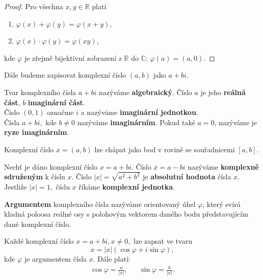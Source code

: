 \begin{proof}
    Pro všechna $x,y \in \mathbb R$ platí
    \begin{enumerate}[$i.$]
    \item $\varphi(x)+\varphi(y) = \varphi(x+y),$
   	\item $\varphi(x)\cdot\varphi(y) = \varphi(xy),$
    \end{enumerate}
    kde $\varphi$ je zřejmě bijektivní zobrazení z $\mathbb R$ do $\mathbb C$: $\varphi(a)=(a,0).$
\end{proof}

\begin{pozn}
    Dále budeme zapisovat komplexní číslo $(a,b)$ jako $a+bi.$
\end{pozn}

\begin{definition}
    Tvar komplexního čísla $a+bi$ nazýváme \textbf{algebraický}. Číslo $a$ je jeho
   \textbf{reálná část}, $b$ \textbf{imaginární část}.\\
  Číslo $(0,1)$ označme $i$ a nazýváme \textbf{imaginární jednotkou}. \\
  Čísla $a+bi,$ kde $b\ne 0$ nazýváme \textbf{imaginárním}. Pokud také $a=0$,
  nazýváme je \textbf{ryze imaginárním}.
\end{definition}

\begin{pozn}
    Komplexní číslo $x=(a,b)$ lze chápat jako bod v rovině se souřadnicemi $[a,b].$
\end{pozn}

\begin{definition}
    Nechť je dáno komplexní číslo $x= a+bi.$ Číslo $\overline{x}=a-bi$ nazýváme
   \textbf{komplexně sdruženým} k číslu $x$. Číslo $|x|=\sqrt{a^2+b^2}$ je
   \textbf{absolutní hodnota} čísla $x$. Jestliže $|x|=1,$ číslu $x$ říkáme \textbf{komplexní jednotka}.
\end{definition}

\begin{definition}
\textbf{Argumentem} komplexního čísla nazýváme orientovaný úhel $\varphi$, který svírá kladná
poloosa reálné osy s polohovým vektorem daného bodu představujícím dané komplexní číslo.
\end{definition}

\begin{veta}
    Každé komplexní číslo $x=a+bi, x\ne 0,$ lze zapsat ve tvaru
    $$x=|x|(\cos \varphi + i \sin \varphi),$$
    kde $\varphi$ je argumentem čísla $x$. Dále platí:
    \begin{align*}
        \cos \varphi = \frac{a}{|x|}, && \sin \varphi = \frac{b}{|x|}.
    \end{align*}
\end{veta}


